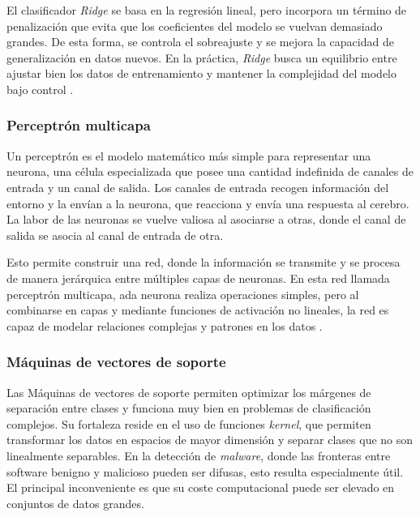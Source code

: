 El clasificador \textit{Ridge} se basa en la regresión lineal, pero incorpora un término de penalización que evita que los coeficientes del modelo se vuelvan demasiado grandes. De esta forma, se controla el sobreajuste y se mejora la capacidad de generalización en datos nuevos. En la práctica, \textit{Ridge} busca un equilibrio entre ajustar bien los datos de entrenamiento y mantener la complejidad del modelo bajo control \cite{ridge_sklearn}.

\newpage
\subsubsection{Perceptrón multicapa}
\label{subsubsec:mlp}

Un perceptrón es el modelo matemático más simple para representar una neurona, una célula especializada que posee una cantidad indefinida de canales de entrada y un canal de salida. Los canales de entrada recogen información del entorno y la envían a la neurona, que reacciona y envía una respuesta al cerebro. La labor de las neuronas se vuelve valiosa al asociarse a otras, donde el canal de salida se asocia al canal de entrada de otra.

\vspace{1em}

Esto permite construir una red, donde la información se transmite y se procesa de manera jerárquica entre múltiples capas de neuronas. En esta red llamada perceptrón multicapa, ada neurona realiza operaciones simples, pero al combinarse en capas y mediante funciones de activación no lineales, la red es capaz de modelar relaciones complejas y patrones en los datos \cite{perceptron}.

\vspace{1em}

\subsubsection{Máquinas de vectores de soporte}
\label{subsubsec:svm}

Las Máquinas de vectores de soporte permiten optimizar los márgenes de separación entre clases y funciona muy bien en problemas de clasificación complejos. Su fortaleza reside en el uso de funciones \textit{kernel}, que permiten transformar los datos en espacios de mayor dimensión y separar clases que no son linealmente separables. En la detección de \textit{malware}, donde las fronteras entre software benigno y malicioso pueden ser difusas, esto resulta especialmente útil. El principal inconveniente es que su coste computacional puede ser elevado en conjuntos de datos grandes.

